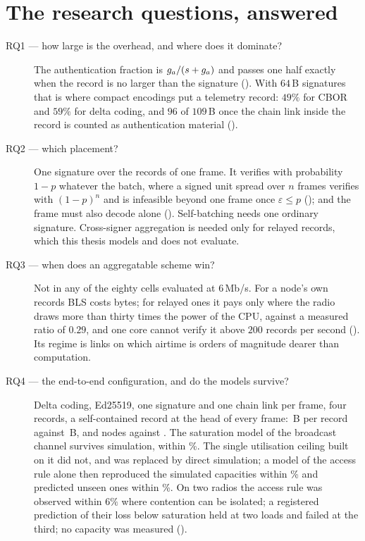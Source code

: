\section{The research questions, answered}\label{sec:rq-answers}

\begin{description}
\item[RQ1 --- how large is the overhead, and where does it dominate?] The authentication
fraction is $g_a/(s+g_a)$ and passes one half exactly when the record is no larger than the
signature (). With $64$\,B signatures that is where compact encodings put a
telemetry record: $49\%$ for CBOR and $59\%$ for delta coding, and $96$ of $109$\,B once the
chain link inside the record is counted as authentication material ().

\item[RQ2 --- which placement?] One signature over the records of one frame. It verifies with
probability $1-p$ whatever the batch, where a signed unit spread over $n$ frames verifies with
$(1-p)^n$ and is infeasible beyond one frame once $\varepsilon \leq p$
(); and the frame must also decode alone ().
Self-batching needs one ordinary signature. Cross-signer aggregation is needed only for
relayed records, which this thesis models and does not evaluate.

\item[RQ3 --- when does an aggregatable scheme win?] Not in any of the eighty cells evaluated
at $6$\,Mb/s. For a node's own records BLS costs bytes; for relayed ones it pays only where the
radio draws more than thirty times the power of the CPU, against a measured ratio of $0.29$, and
one core cannot verify it above $200$ records per second (). Its regime is
links on which airtime is orders of magnitude dearer than computation.

\item[RQ4 --- the end-to-end configuration, and do the models survive?] Delta coding, Ed25519,
one signature and one chain link per frame, four records, a self-contained record at the head of
every frame: \bprLeanDesign\,B per record against \bprLeanBase\,B, and \nmaxLeanDesign{} nodes
against \nmaxLeanBase. The saturation model of the broadcast channel survives simulation, within
\valBcast\%. The single utilisation ceiling built on it did not, and was replaced by direct
simulation; a model of the access rule alone then reproduced the simulated capacities within
\modelWorst\% and predicted \modelPredCases{} unseen ones within \modelPredWorst\%. On two
radios the access rule was observed within $6\%$ where contention can be isolated; a registered
prediction of their loss below saturation held at two loads and failed at the third; no
capacity was measured ().


\end{description}
